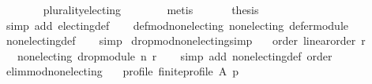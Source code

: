 \begin{isabellebody}
\ \ \ \ \ \ \isamarkupfalse%
\ plurality{\isacharunderscore}{\kern0pt}electing{}\isanewline
\ \ \ \ \ \ \isamarkupfalse%
\ metis\isanewline
\ \ \isamarkupfalse%
\isanewline
\ \ \isamarkupfalse%
\ {\isacharquery}{\kern0pt}thesis\isanewline
\ \ \ \ \ \ \isamarkupfalse%
\ {\isacharparenleft}{\kern0pt}simp\ add{\isacharcolon}{\kern0pt}\ electing{\isacharunderscore}{\kern0pt}def{\isacharparenright}{\kern0pt}\isanewline
\ \ \isamarkupfalse%
%
\endisatagproof
{\isafoldproof}%
%
\isadelimproof
\isanewline
%
\endisadelimproof
\isanewline
{}\isamarkupfalse%
\ def{\isacharunderscore}{\kern0pt}mod{\isacharunderscore}{\kern0pt}non{\isacharunderscore}{\kern0pt}electing{\isacharcolon}{\kern0pt}\ {\isachardoublequoteopen}non{\isacharunderscore}{\kern0pt}electing\ defer{\isacharunderscore}{\kern0pt}module{\isachardoublequoteclose}\isanewline
%
\isadelimproof
\ \ %
\endisadelimproof
%
\isatagproof
{}\isamarkupfalse%
\ non{\isacharunderscore}{\kern0pt}electing{\isacharunderscore}{\kern0pt}def\isanewline
\ \ \isamarkupfalse%
\ simp%
\endisatagproof
{\isafoldproof}%
%
\isadelimproof
\isanewline
%
\endisadelimproof
\isanewline
\isanewline
\isanewline
{}\isamarkupfalse%
\ drop{\isacharunderscore}{\kern0pt}mod{\isacharunderscore}{\kern0pt}non{\isacharunderscore}{\kern0pt}electing{\isacharbrackleft}{\kern0pt}simp{\isacharbrackright}{\kern0pt}{\isacharcolon}{\kern0pt}\isanewline
\ \ \ order{\isacharcolon}{\kern0pt}\ {\isachardoublequoteopen}linear{\isacharunderscore}{\kern0pt}order\ r{\isachardoublequoteclose}\isanewline
\ \ \ {\isachardoublequoteopen}non{\isacharunderscore}{\kern0pt}electing\ {\isacharparenleft}{\kern0pt}drop{\isacharunderscore}{\kern0pt}module\ n\ r{\isacharparenright}{\kern0pt}{\isachardoublequoteclose}\isanewline
%
\isadelimproof
\ \ %
\endisadelimproof
%
\isatagproof
{}\isamarkupfalse%
\ {\isacharparenleft}{\kern0pt}simp\ add{\isacharcolon}{\kern0pt}\ non{\isacharunderscore}{\kern0pt}electing{\isacharunderscore}{\kern0pt}def\ order{\isacharparenright}{\kern0pt}%
\endisatagproof
{\isafoldproof}%
%
\isadelimproof
\isanewline
%
\endisadelimproof
\isanewline
{}\isamarkupfalse%
\ elim{\isacharunderscore}{\kern0pt}mod{\isacharunderscore}{\kern0pt}non{\isacharunderscore}{\kern0pt}electing{\isacharcolon}{\kern0pt}\isanewline
\ \ \ profile{\isacharcolon}{\kern0pt}\ {\isachardoublequoteopen}finite{\isacharunderscore}{\kern0pt}profile\ A\ p{\isachardoublequoteclose}\isanewline

\end{isabellebody}
